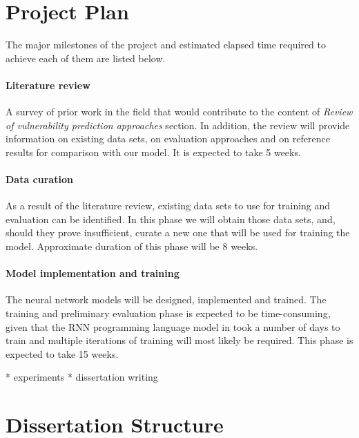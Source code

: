 \documentclass[proposal]{softeng}
\begin{document}
\section{Project Plan}

The major milestones of the project and estimated elapsed time required to achieve
each of them are listed below.

\paragraph{Literature review} A survey of prior work in the field that would contribute
to the content of \emph{Review of vulnerability prediction approaches} section. 
In addition, the review will 
provide information on existing data sets, on evaluation approaches and on reference 
results for comparison with our model. It is expected to take 5 weeks.

\paragraph{Data curation} As a result of the literature review, existing data sets
to use for training and evaluation can be identified. In this phase we will obtain
those data sets, and, should they prove insufficient, curate a new one that will be
used for training the model. Approximate duration of this phase will be 8 weeks.

\paragraph{Model implementation and training} The neural network models will be 
designed, implemented and trained. The training and preliminary evaluation phase 
is expected to be time-consuming, given that the RNN programming language model in 
\cite{karpathy2015unreasonable} took a number of days
to train and multiple iterations of training will most likely be required. This phase 
is expected to take 15 weeks.


* experiments
* dissertation writing


\section{Dissertation Structure}
\end{document}
